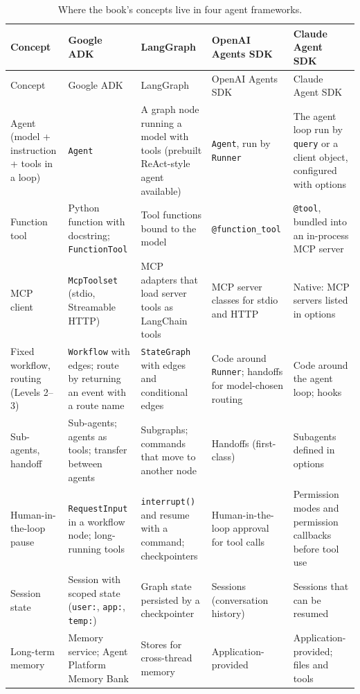 \begingroup
\scriptsize \setlength{\tabcolsep}{3.5pt}
\begin{xltabular}{\textwidth}{@{}>{\raggedright\arraybackslash}p{2.1cm}>{\raggedright\arraybackslash}X>{\raggedright\arraybackslash}X>{\raggedright\arraybackslash}X>{\raggedright\arraybackslash}X@{}}
\caption{Where the book's concepts live in four agent frameworks.}\label{tab:mapping}\\
\toprule
Concept & Google ADK & LangGraph & OpenAI Agents SDK & Claude Agent SDK \\
\midrule
\endfirsthead
\toprule
Concept & Google ADK & LangGraph & OpenAI Agents SDK & Claude Agent SDK \\
\midrule
\endhead
Agent (model + instruction + tools in a loop) & \texttt{Agent} & A graph node running a model with tools (prebuilt ReAct-style agent available) & \texttt{Agent}, run by \texttt{Runner} & The agent loop run by \texttt{query} or a client object, configured with options \\
Function tool & Python function with docstring; \texttt{FunctionTool} & Tool functions bound to the model & \texttt{@function\_tool} & \texttt{@tool}, bundled into an in-process MCP server \\
MCP client & \texttt{McpToolset} (stdio, Streamable HTTP) & MCP adapters that load server tools as LangChain tools & MCP server classes for stdio and HTTP & Native: MCP servers listed in options \\
Fixed workflow, routing (Levels 2--3) & \texttt{Workflow} with edges; route by returning an event with a route name & \texttt{StateGraph} with edges and conditional edges & Code around \texttt{Runner}; handoffs for model-chosen routing & Code around the agent loop; hooks \\
Sub-agents, handoff & Sub-agents; agents as tools; transfer between agents & Subgraphs; commands that move to another node & Handoffs (first-class) & Subagents defined in options \\
Human-in-the-loop pause & \texttt{RequestInput} in a workflow node; long-running tools & \texttt{interrupt()} and resume with a command; checkpointers & Human-in-the-loop approval for tool calls & Permission modes and permission callbacks before tool use \\
Session state & Session with scoped state (\texttt{user:}, \texttt{app:}, \texttt{temp:}) & Graph state persisted by a checkpointer & Sessions (conversation history) & Sessions that can be resumed \\
Long-term memory & Memory service; Agent Platform Memory Bank & Stores for cross-thread memory & Application-provided & Application-provided; files and tools \\

\end{xltabular}
